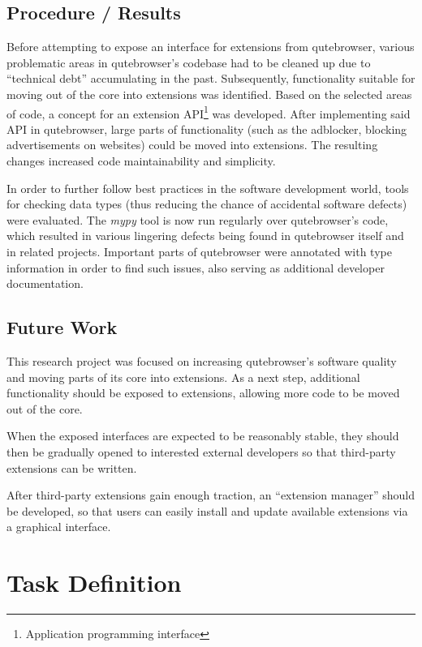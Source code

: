 \documentclass[a4paper,parskip=full]{scrreprt}
\begin{document}
\section*{Procedure / Results}
Before attempting to expose an interface for extensions from qutebrowser,
various problematic areas in qutebrowser's codebase had to be cleaned up due to
``technical debt'' accumulating in the past. Subsequently, functionality
suitable for moving out of the core into extensions was identified. Based on
the selected areas of code, a concept for an extension API\footnote{Application
programming interface} was developed. After implementing said API in
qutebrowser, large parts of functionality (such as the adblocker, blocking
advertisements on websites) could be moved into extensions. The resulting
changes increased code maintainability and simplicity.

In order to further follow best practices in the software development world,
tools for checking data types (thus reducing the chance of accidental software
defects) were evaluated. The \emph{mypy} tool is now run regularly over
qutebrowser's code, which resulted in various lingering defects being found in
qutebrowser itself and in related projects. Important parts of qutebrowser were
annotated with type information in order to find such issues, also serving as
additional developer documentation.

\section*{Future Work}
This research project was focused on increasing qutebrowser's software quality
and moving parts of its core into extensions. As a next step, additional
functionality should be exposed to extensions, allowing more code to be moved
out of the core.

When the exposed interfaces are expected to be reasonably stable,
they should then be gradually opened to interested external developers so that
third-party extensions can be written.

After third-party extensions gain enough traction, an ``extension manager''
should be developed, so that users can easily install and update available
extensions via a graphical interface.

\tableofcontents

\listoffigures
{\let\clearpage\relax \listoftables}
{\let\clearpage\relax \listoflistings}


\chapter*{Task Definition}
\end{document}
